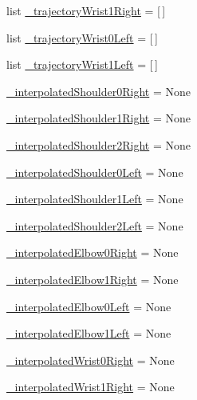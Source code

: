 \begin{DoxyCompactItemize}
\item 
list \mbox{\hyperlink{namespacesteering__simulation_a48daa3f5dc8c583ae35007d94df2303e}{\+\_\+trajectory\+Wrist1\+Right}} = \mbox{[}$\,$\mbox{]}
\item 
list \mbox{\hyperlink{namespacesteering__simulation_a65b6250dbe1a9a65e76a41c62da9ea7e}{\+\_\+trajectory\+Wrist0\+Left}} = \mbox{[}$\,$\mbox{]}
\item 
list \mbox{\hyperlink{namespacesteering__simulation_a4f098ae88427b37c42fde098a61fb399}{\+\_\+trajectory\+Wrist1\+Left}} = \mbox{[}$\,$\mbox{]}
\item 
\mbox{\hyperlink{namespacesteering__simulation_ab34c683386394a4c7bb2641db1866aef}{\+\_\+interpolated\+Shoulder0\+Right}} = None
\item 
\mbox{\hyperlink{namespacesteering__simulation_a0e35e7ece667da88fa757991130d307d}{\+\_\+interpolated\+Shoulder1\+Right}} = None
\item 
\mbox{\hyperlink{namespacesteering__simulation_a756387ef588b4049bba42da3f65fef74}{\+\_\+interpolated\+Shoulder2\+Right}} = None
\item 
\mbox{\hyperlink{namespacesteering__simulation_a02b9a3d44de85acf12552bea98742482}{\+\_\+interpolated\+Shoulder0\+Left}} = None
\item 
\mbox{\hyperlink{namespacesteering__simulation_a3d00a16f91310a8d1e087d1ae152ac7e}{\+\_\+interpolated\+Shoulder1\+Left}} = None
\item 
\mbox{\hyperlink{namespacesteering__simulation_ac4a5b7a74bda32146e2330b740a782e5}{\+\_\+interpolated\+Shoulder2\+Left}} = None
\item 
\mbox{\hyperlink{namespacesteering__simulation_ae6eeda8709f7c3112029ba2123f2a0cd}{\+\_\+interpolated\+Elbow0\+Right}} = None
\item 
\mbox{\hyperlink{namespacesteering__simulation_ac91c7d1fa823783ae6d5e03fd9ebdddb}{\+\_\+interpolated\+Elbow1\+Right}} = None
\item 
\mbox{\hyperlink{namespacesteering__simulation_ab4a2cd7647ac12ccda18d55806c1c968}{\+\_\+interpolated\+Elbow0\+Left}} = None
\item 
\mbox{\hyperlink{namespacesteering__simulation_ab9d03f365a99bbc5047aa6f1693bb650}{\+\_\+interpolated\+Elbow1\+Left}} = None
\item 
\mbox{\hyperlink{namespacesteering__simulation_aaec0a977fbc1c9147a917be325f3a411}{\+\_\+interpolated\+Wrist0\+Right}} = None
\item 
\mbox{\hyperlink{namespacesteering__simulation_a348d2aedeba474cdc52c04f6920c8d2b}{\+\_\+interpolated\+Wrist1\+Right}} = None

\end{DoxyCompactItemize}
